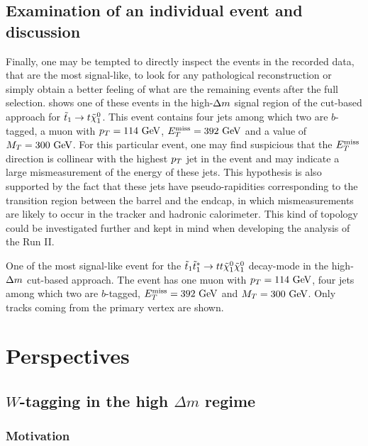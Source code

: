     \subsection{Examination of an individual event and discussion}

    Finally, one may be tempted to directly inspect the events in the recorded data, that are the
    most signal-like, to look for any pathological reconstruction or simply obtain a
    better feeling of what are the remaining events after the full selection. 
    shows one of these events in the high-$\Delta m$ signal region of the cut-based approach
    for $\tilde{t}_1 \rightarrow t \tilde{\chi}_1^0$. This event contains four jets among which
    two are $b$-tagged, a muon with $p_T = 114~\text{GeV}$, $E_T^\text{miss} = 392~\text{GeV}$ and a value of $M_T =
    300~\text{GeV}$. For this particular event, one may find suspicious that the $E_T^\text{miss}$ direction
    is collinear with the highest $p_T$ jet in the event and may indicate a large mismeasurement
    of the energy of these jets. This hypothesis is also supported by the fact that these
    jets have pseudo-rapidities corresponding to the transition region between the barrel
    and the endcap, in which mismeasurements are likely to occur in the tracker and hadronic
    calorimeter. This kind of topology could be investigated further and kept in mind when
    developing the analysis of the Run II.

    {One of the most signal-like event for the $\tilde{t}_1 \tilde{t}_1^{*} \rightarrow t t \tilde{\chi}_1^0 \tilde{\chi}_1^0$
    decay-mode in the high-$\Delta m$ cut-based approach. The event has one muon with
    $p_T = 114~\text{GeV}$, four jets among which two are $b$-tagged, $E_T^\text{miss} = 392~\text{GeV}$ and $M_T = 300 ~\text{GeV}$.
    Only tracks coming from the primary vertex are shown.}

    \newpage

    \section{Perspectives \label{sec:analysis_perspective}}

    \subsection{$W$-tagging in the high $\Delta m$ regime}

    \subsubsection{Motivation}

